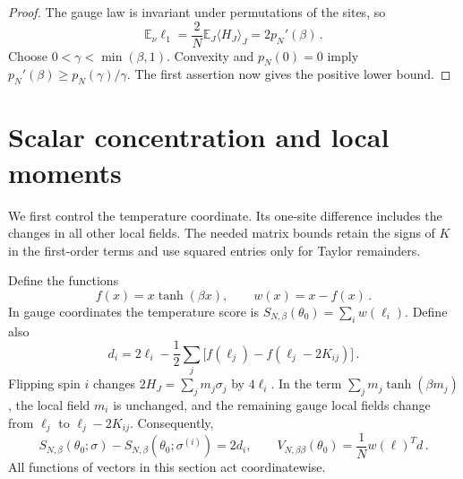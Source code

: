 \documentclass[11pt]{amsart}
\numberwithin{equation}{section}
\theoremstyle{remark}
\newcommand{\E}{\mathbb E}
\begin{document}
\begin{proof}
The gauge law is invariant under permutations of the sites, so
\begin{equation}
 \E_\nu\ell_1=\frac2N\E_J\langle H_J\rangle_J=2p_N'(\beta)\,.
 \label{eq:mean-local-field}
\end{equation}
Choose $0<\gamma<\min(\beta,1)$. Convexity and $p_N(0)=0$ imply $p_N'(\beta)\ge p_N(\gamma)/\gamma$. The first assertion now gives the positive lower bound.
\end{proof}

\section{Scalar concentration and local moments}\label{sec:scalar}

We first control the temperature coordinate. Its one-site difference includes the changes in all other local fields. The needed matrix bounds retain the signs of $K$ in the first-order terms and use squared entries only for Taylor remainders.

Define the functions
\begin{equation}
 f(x)=x\tanh(\beta x),\qquad
 w(x)=x-f(x)\,.
 \label{eq:f-w}
\end{equation}
In gauge coordinates the temperature score is $S_{N,\beta}(\theta_0)=\sum_iw(\ell_i)$. Define also
\begin{equation}
 d_i=2\ell_i-\frac12\sum_j
 \bigl[f(\ell_j)-f(\ell_j-2K_{ij})\bigr]\,.
 \label{eq:d-definition}
\end{equation}
Flipping spin $i$ changes $2H_J=\sum_jm_j\sigma_j$ by $4\ell_i$. In the term $\sum_jm_j\tanh(\beta m_j)$, the local field $m_i$ is unchanged, and the remaining gauge local fields change from $\ell_j$ to $\ell_j-2K_{ij}$. Consequently,
\begin{equation}
 S_{N,\beta}(\theta_0;\sigma)-S_{N,\beta}(\theta_0;\sigma^{(i)})=2d_i,
 \qquad
 V_{N,\beta\beta}(\theta_0)=\frac1Nw(\ell)^Td\,.
 \label{eq:scalar-flip}
\end{equation}
All functions of vectors in this section act coordinatewise.
\end{document}
